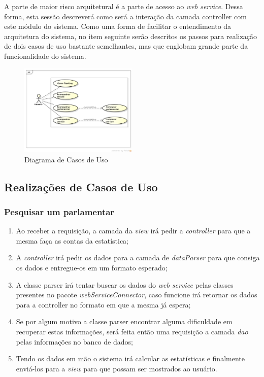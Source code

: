 A parte de maior risco arquitetural é a parte de acesso ao \textit{web service}. Dessa forma, esta sessão descreverá como será a interação da camada controller com este módulo do sistema. Como uma forma de facilitar o entendimento da arquitetura do sistema, no item seguinte serão descritos os passos para realização de dois casos de uso bastante semelhantes, mas que englobam grande parte da funcionalidade do sistema.

\begin{figure}[H]
	\centering
	\includegraphics[width=0.5\textwidth]{conteudo/diagrama_caso_de_uso}
	\caption{Diagrama de Casos de Uso}
	\label{img:diagrama_arquitetura}
\end{figure}

\subsection{Realizações de Casos de Uso}
	
	\subsubsection{Pesquisar um parlamentar}

		\begin{enumerate}
			\item Ao receber a requisição, a camada da \textit{view} irá pedir a \textit{controller} para que a mesma faça as contas da estatística;

			\item A \textit{controller} irá pedir os dados para a camada de \textit{dataParser} para que consiga os dados e entregue-os em um formato esperado;

			\item A classe parser irá tentar buscar os dados do \textit{web service} pelas classes presentes no pacote \textit{webServiceConnector}, caso funcione irá retornar os dados para a controller no formato em que a mesma já espera;

			\item Se por algum motivo a classe parser encontrar alguma dificuldade em recuperar estas informações, será feita então uma requisição a camada \textit{dao} pelas informações no banco de dados;

			\item Tendo os dados em mão o sistema irá calcular as estatísticas e finalmente enviá-los para a \textit{view} para que possam ser mostrados ao usuário.
		\end{enumerate}

